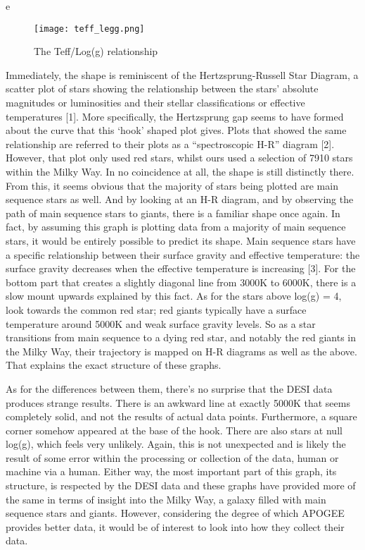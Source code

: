 e\documentclass{article}
\begin{document}
\begin{figure}[h!tbp]
    \centering
    \texttt{[image: teff\_legg.png]}
    \caption{The Teff/Log(g) relationship}
    \label{fig:3}
\end{figure}

\indent Immediately, the shape is reminiscent of the Hertzsprung-Russell Star Diagram, a scatter plot of stars showing the relationship between the stars' absolute magnitudes or luminosities and their stellar classifications or effective temperatures [1]. More specifically, the Hertzsprung gap seems to have formed about the curve that this ‘hook’ shaped plot gives. Plots that showed the same relationship are referred to their plots as a “spectroscopic H-R” diagram [2]. However, that plot only used red stars, whilst ours used a selection of 7910 stars within the Milky Way. In no coincidence at all, the shape is still distinctly there. From this, it seems obvious that the majority of stars being plotted are main sequence stars as well. And by looking at an H-R diagram, and by observing the path of main sequence stars to giants, there is a familiar shape once again. In fact, by assuming this graph is plotting data from a majority of main sequence stars, it would be entirely possible to predict its shape. Main sequence stars have a specific relationship between their surface gravity and effective temperature: the surface gravity decreases when the effective temperature is increasing [3]. For the bottom part that creates a slightly diagonal line from 3000K to 6000K, there is a slow mount upwards explained by this fact. As for the stars above log(g) = 4, look towards the common red star; red giants typically have a surface temperature around 5000K and weak surface gravity levels. So as a star transitions from main sequence to a dying red star, and notably the red giants in the Milky Way, their trajectory is mapped on H-R diagrams as well as the above. That explains the exact structure of these graphs.

\indent As for the differences between them, there’s no surprise that the DESI data produces strange results. There is an awkward line at exactly 5000K that seems completely solid, and not the results of actual data points. Furthermore, a square corner somehow appeared at the base of the hook. There are also stars at null log(g), which feels very unlikely. Again, this is not unexpected and is likely the result of some error within the processing or collection of the data, human or machine via a human. Either way, the most important part of this graph, its structure, is respected by the DESI data and these graphs have provided more of the same in terms of insight into the Milky Way, a galaxy filled with main sequence stars and giants. However, considering the degree of which APOGEE provides better data, it would be of interest to look into how they collect their data.\\
\end{document}
